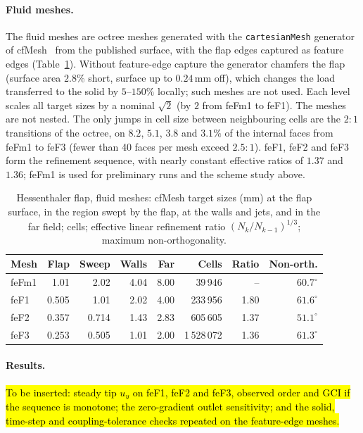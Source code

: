 \paragraph{Fluid meshes.}
The fluid meshes are octree meshes generated with the \texttt{cartesianMesh} generator of cfMesh~\citep{Juretic2015cfMesh} from the published surface, with the flap edges captured as feature edges (Table~\ref{tab:hessenthaler_meshes}).
Without feature-edge capture the generator chamfers the flap (surface area $2.8\%$ short, surface up to $0.24\,\mathrm{mm}$ off), which changes the load transferred to the solid by $5$--$150\%$ locally; such meshes are not used.
Each level scales all target sizes by a nominal $\sqrt{2}$ (by $2$ from feFm1 to feF1). The meshes are not nested.
The only jumps in cell size between neighbouring cells are the $2{:}1$ transitions of the octree, on $8.2$, $5.1$, $3.8$ and $3.1\%$ of the internal faces from feFm1 to feF3 (fewer than 40 faces per mesh exceed $2.5{:}1$).
feF1, feF2 and feF3 form the refinement sequence, with nearly constant effective ratios of $1.37$ and $1.36$; feFm1 is used for preliminary runs and the scheme study above.

\begin{table}[htbp]
	\centering
	\small
	\caption{Hessenthaler flap, fluid meshes: cfMesh target sizes (mm) at the flap surface, in the region swept by the flap, at the walls and jets, and in the far field; cells; effective linear refinement ratio $(N_k/N_{k-1})^{1/3}$; maximum non-orthogonality.}
	\label{tab:hessenthaler_meshes}
	\begin{tabular}{lrrrrrrr}
		\toprule
		Mesh & Flap & Sweep & Walls & Far & Cells & Ratio & Non-orth. \\
		\midrule
		feFm1 & 1.01 & 2.02 & 4.04 & 8.00 & 39\,946 & -- & $60.7^\circ$ \\
		feF1 & 0.505 & 1.01 & 2.02 & 4.00 & 233\,956 & 1.80 & $61.6^\circ$ \\
		feF2 & 0.357 & 0.714 & 1.43 & 2.83 & 605\,605 & 1.37 & $51.1^\circ$ \\
		feF3 & 0.253 & 0.505 & 1.01 & 2.00 & 1\,528\,072 & 1.36 & $61.3^\circ$ \\
		\bottomrule
	\end{tabular}
\end{table}

\paragraph{Results.}
\hl{To be inserted: steady tip $u_y$ on feF1, feF2 and feF3, observed order and GCI if the sequence is monotone; the zero-gradient outlet sensitivity; and the solid, time-step and coupling-tolerance checks repeated on the feature-edge meshes.}


